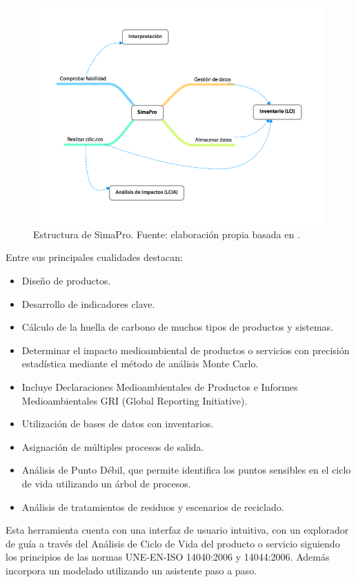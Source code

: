\begin{figure}[!htb]
\centering
\includegraphics[width=13cm]{img/simapro.png}
\caption[Estructura de SimaPro.]{Estructura de SimaPro. Fuente: elaboración propia basada en \protect\cite{mgoedkoop2}.}
\label{fig:simapro}
\end{figure}

Entre sus principales cualidades destacan:
\begin{itemize}
  \item Diseño de productos.
  \item Desarrollo de indicadores clave.
  \item Cálculo de la huella de carbono de muchos tipos de productos y sistemas.
  \item Determinar el impacto medioambiental de productos o servicios con precisión estadística mediante el método de análisis Monte Carlo.
  \item Incluye Declaraciones Medioambientales de Productos e Informes Medioambientales GRI (Global Reporting Initiative).
  \item Utilización de bases de datos con inventarios.
  \item Asignación de múltiples procesos de salida.
  \item Análisis de Punto Débil, que permite identifica los puntos sensibles en el ciclo de vida utilizando un árbol de procesos.
  \item Análisis de tratamientos de residuos y escenarios de reciclado.
\end{itemize}

Esta herramienta cuenta con una interfaz de usuario intuitiva, con un explorador de guía a través del Análisis de Ciclo de Vida del producto o servicio siguiendo los principios de las normas UNE-EN-ISO 14040:2006 y 14044:2006. Además incorpora un modelado utilizando un asistente paso a paso.

